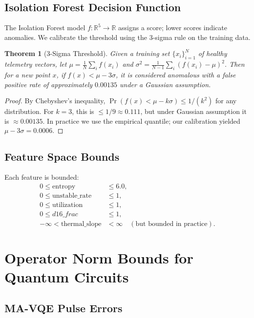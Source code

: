 \documentclass[11pt,a4paper]{article}
\newtheorem{theorem}{Theorem}
\theoremstyle{plain}
\begin{document}
\subsection{Isolation Forest Decision Function}

The Isolation Forest model $f: \mathbb{R}^5 \to \mathbb{R}$ assigns a score; lower scores indicate anomalies. We calibrate the threshold using the 3-sigma rule on the training data.

\begin{theorem}[3-Sigma Threshold]
Given a training set $\{x_i\}_{i=1}^N$ of healthy telemetry vectors, let $\mu = \frac{1}{N}\sum_i f(x_i)$ and $\sigma^2 = \frac{1}{N-1}\sum_i (f(x_i)-\mu)^2$. Then for a new point $x$, if $f(x) < \mu - 3\sigma$, it is considered anomalous with a false positive rate of approximately $0.00135$ under a Gaussian assumption.
\end{theorem}

\begin{proof}
By Chebyshev's inequality, $\Pr(f(x) < \mu - k\sigma) \leq 1/(k^2)$ for any distribution. For $k=3$, this is $\leq 1/9 \approx 0.111$, but under Gaussian assumption it is $\approx 0.00135$. In practice we use the empirical quantile; our calibration yielded $\mu - 3\sigma = 0.0006$.
\end{proof}

\subsection{Feature Space Bounds}

Each feature is bounded:
\begin{align}
0 \leq \text{entropy} &\leq 6.0,\\
0 \leq \text{unstable\_rate} &\leq 1,\\
0 \leq \text{utilization} &\leq 1,\\
0 \leq d16\_frac &\leq 1,\\
-\infty < \text{thermal\_slope} &< \infty \quad (\text{but bounded in practice}).
\end{align}

\section{Operator Norm Bounds for Quantum Circuits}

\subsection{MA-VQE Pulse Errors}
\end{document}

